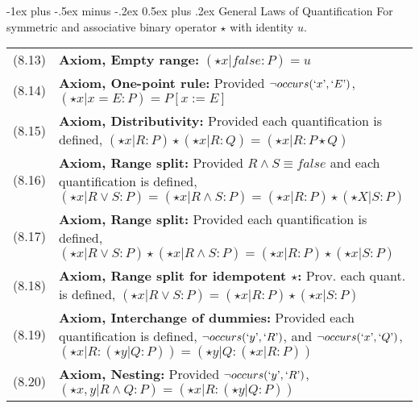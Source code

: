 \documentclass[letterpaper, 8pt]{extarticle}
\makeatletter
\renewcommand{\section}{\@startsection{section}{1}{0mm}%
                                {-1ex plus -.5ex minus -.2ex}%
                                {0.5ex plus .2ex}%
                                {\normalfont\normalsize\bfseries}}
\makeatother
\begin{document}
\begin{multicols*}{3}
    \section{General Laws of Quantification}
    For symmetric and associative binary operator $\star $ with identity $u$.
    \begin{tabulary}{\linewidth}{@{}lL@{}}
        (8.13) & \textbf{Axiom, Empty range:} $(\star x | false : P) = u$                                                                                                                                                                                   \\
        (8.14) & \textbf{Axiom, One-point rule:} Provided $\neg occurs(`x\textrm', `E\textrm')$, $(\star x | x = E : P) = P[x := E]$                                                                                                                        \\
        (8.15) & \textbf{Axiom, Distributivity:} Provided each quantification is defined, $(\star x | R:P) \star  (\star x | R : Q) = (\star x | R : P \star  Q)$                                                                                           \\
        (8.16) & \textbf{Axiom, Range split:} Provided $R \land S \equiv false$ and each quantification is defined, $(\star x | R \lor S : P) = (\star x | R \land S : P) = (\star x | R : P) \star  (\star X | S : P)$                                     \\
        (8.17) & \textbf{Axiom, Range split:} Provided each quantification is defined, $(\star x | R \lor S : P) \star  (\star x | R \land S : P) = (\star x | R : P) \star  (\star x | S : P)$                                                             \\
        (8.18) & \textbf{Axiom, Range split for idempotent $\star$:} Prov. each quant. is defined, $(\star x | R \lor S : P) = (\star x | R : P) \star (\star x | S : P)$                                                                                   \\
        (8.19) & \textbf{Axiom, Interchange of dummies:} Provided each quantification is defined, $\neg occurs(`y\textrm', `R\textrm')$, and $\neg occurs(`x\textrm', `Q\textrm')$, $(\star x | R : (\star y | Q : P)) = (\star y | Q : (\star x | R : P))$ \\
        (8.20) & \textbf{Axiom, Nesting:} Provided $\neg occurs(`y\textrm', `R\textrm')$, $(\star x, y | R \land Q : P) = (\star x | R : (\star y | Q : P))$                                                                                                \\

\end{tabulary}
\end{multicols*}
\end{document}
